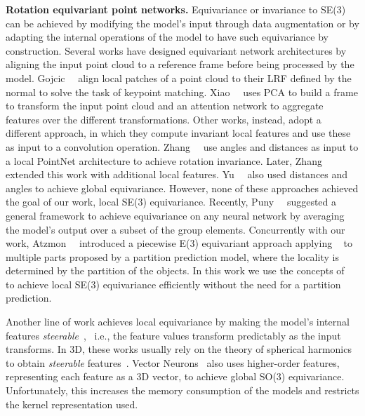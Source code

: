 \textbf{Rotation equivariant point networks.}
Equivariance or invariance to SE(3) can be achieved by modifying the model's input through data augmentation or by adapting the internal operations of the model to have such equivariance by construction. 
Several works have designed equivariant network architectures by aligning the input point cloud to a reference frame before being processed by the model.
Gojcic~\etal~\cite{gojcic20193DSmoothNet} align local patches of a point cloud to their \ac{LRF} defined by the normal to solve the task of keypoint matching.
Xiao~\etal~\cite{xiao2020pca} uses \ac{PCA} to build a frame to transform the input point cloud and an attention network to aggregate features over the different transformations.
Other works, instead, adopt a different approach, in which they compute invariant local features and use these as input to a convolution operation.
Zhang~\etal~\cite{zhang-riconv-3dv19} use angles and distances as input to a local PointNet architecture to achieve rotation invariance.
Later, Zhang~\etal~\cite{zhang2022riconv2} extended this work with additional local features.
Yu~\etal~\cite{yupositionalfeature2020} also used distances and angles to achieve global equivariance.
However, none of these approaches achieved the goal of our work, local SE(3) equivariance.
Recently, Puny~\etal~\cite{puny2022frame} suggested a general framework to achieve equivariance on any neural network by averaging the model's output over a subset of the group elements. Concurrently with our work, Atzmon~\etal~\cite{atzmonapproximately} introduced a piecewise E(3) equivariant approach applying ~\cite{puny2022frame} to multiple parts proposed by a partition prediction model, where the locality is determined by the partition of the objects.
In this work we use the concepts of~\cite{puny2022frame} to achieve local SE(3) equivariance efficiently without the need for a partition prediction.

Another line of work achieves local equivariance by making the model's internal features \emph{steerable}~\cite{cohen2016steerable}, \,  i.e., the feature values transform predictably as the input transforms.
In 3D, these works usually rely on the theory of spherical harmonics to obtain \emph{steerable} features~\cite{thomas2018tensor, fuchs2020se3transformers, weiler20183dsteercnn}. 
Vector Neurons~\cite{deng2021vector} also uses higher-order features, representing each feature as a 3D vector, to achieve global SO(3) equivariance.
Unfortunately, this increases the memory consumption of the models and restricts the kernel representation used.

